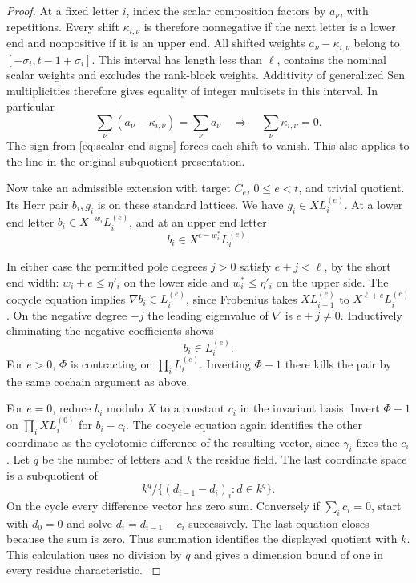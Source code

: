 \begin{proof}
At a fixed letter \(i\), index the scalar composition factors by
\(a_\nu\), with repetitions. Every shift \(\kappa_{i,\nu}\)
is therefore nonnegative if the next letter is a lower end and
nonpositive if it is an upper end. All shifted weights
\(a_\nu-\kappa_{i,\nu}\) belong to
\([-\sigma_i,t-1+\sigma_i]\). This interval has length less than
\(\ell\), contains the nominal scalar weights and excludes the
rank-block weights. Additivity of generalized Sen multiplicities
therefore gives equality of integer multisets in this interval.
In particular
\[
 \sum_\nu (a_\nu-\kappa_{i,\nu})=\sum_\nu a_\nu
 \quad\Longrightarrow\quad\sum_\nu \kappa_{i,\nu}=0 .
\]
The sign from \eqref{eq:scalar-end-signs} forces each shift to vanish. This also applies to the line in
the original subquotient presentation.
\label{cor:residue-model-length-7}

Now take an admissible extension with target \(C_e\),
\(0\le e<t\), and trivial quotient. Its Herr pair \(b_i,g_i\)
is on these standard lattices. We have \(g_i\in XL_i^{(e)}\).
At a lower end letter \(b_i\in X^{-w_i}L_i^{(e)}\), and
at an upper end letter
\[
 b_i\in X^{e-w_i^*}L_i^{(e)}.
\]

In either case the permitted pole degrees \(j>0\)
satisfy \(e+j<\ell\), by the short end width:
\(w_i+e\le\eta'_i\) on the lower side and
\(w_i^*\le\eta'_i\) on the upper side.
The cocycle equation implies \(\nabla b_i\in L_i^{(e)}\),
since Frobenius takes \(XL_{i-1}^{(e)}\) to
\(X^{\ell+e}L_i^{(e)}\). On the negative degree \(-j\)
the leading eigenvalue of \(\nabla\) is \(e+j\ne0\).
Inductively eliminating the negative coefficients shows
\[
 b_i\in L_i^{(e)}.
\]
For \(e>0\), \(\Phi\) is contracting
on \(\prod_iL_i^{(e)}\). Inverting \(\Phi-1\) there kills
the pair by the same cochain argument as above.

For \(e=0\), reduce \(b_i\) modulo \(X\) to a constant
\(c_i\) in the invariant basis. Invert \(\Phi-1\)
on \(\prod_i XL_i^{(0)}\) for \(b_i-c_i\).
The cocycle equation again identifies the other
coordinate as the cyclotomic difference of the resulting
vector, since \(\gamma_i\) fixes the \(c_i\).
Let \(q\) be the number of letters and \(k\) the residue
field. The last coordinate space is a subquotient of
\[
 k^q/\{(d_{i-1}-d_i)_i : d\in k^q\}.
\]
On the cycle every difference vector has zero sum. Conversely
if \(\sum_i c_i=0\), start with \(d_0=0\) and solve
\(d_i=d_{i-1}-c_i\) successively. The last equation closes
because the sum is zero. Thus summation identifies the displayed
quotient with \(k\). This calculation uses no division by \(q\)
and gives a dimension bound of one in every residue characteristic.
\label{cor:residue-model-length-8}
\end{proof}
